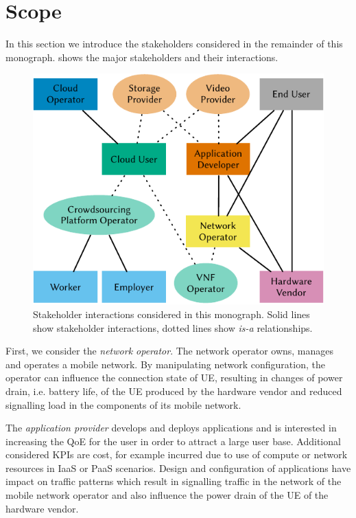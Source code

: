 \section{Scope}\label{sec:introduction:considered_stakeholders}

In this section we introduce the stakeholders considered in the remainder of this monograph.
 shows the major stakeholders and their interactions.

\begin{figure}
\centering
\includegraphics{figures/stakeholders}
\caption{Stakeholder interactions considered in this monograph. Solid lines show stakeholder interactions, dotted lines show \emph{is-a} relationships.}\label{fig:introduction:stakeholders}
\end{figure}

First, we consider the \emph{network operator}.
The network operator owns, manages and operates a mobile network.
By manipulating network configuration, the operator can influence the connection state of \gls{UE}, resulting in changes of power drain, i.e. battery life, of the \gls{UE} produced by the hardware vendor and reduced signalling load in the components of its mobile network.

The \emph{application provider} develops and deploys applications and is interested in increasing the \gls{QoE} for the user in order to attract a large user base.
Additional considered \glspl{KPI} are cost, for example incurred due to use of compute or network resources in \gls{IaaS} or \gls{PaaS} scenarios.
Design and configuration of applications have impact on traffic patterns which result in signalling traffic in the network of the mobile network operator and also influence the power drain of the \gls{UE} of the hardware vendor.

